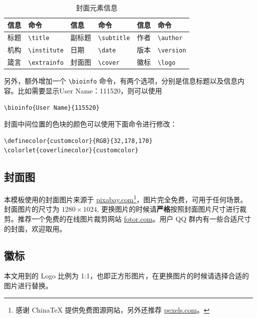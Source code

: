 \documentclass[lang=cn,newtx,10pt,scheme=chinese,pad,twocol]{zznote}
\begin{document}
\begin{table}[htbp]
	\centering
	\caption{封面元素信息}
	\begin{tabular}{p{}p{}|p{}p{}|p{}p{}}
		\hline
		信息 & 命令                     & 信息  & 命令                    & 信息 & 命令                   \\
		\hline
		标题 & \lstinline|\title|     & 副标题 & \lstinline|\subtitle| & 作者 & \lstinline|\author|  \\
		机构 & \lstinline|\institute| & 日期  & \lstinline|\date|     & 版本 & \lstinline|\version| \\
		箴言 & \lstinline|\extrainfo| & 封面图 & \lstinline|\cover|    & 徽标 & \lstinline|\logo|    \\
		\hline
	\end{tabular}
\end{table}

另外，额外增加一个 \lstinline{\bioinfo} 命令，有两个选项，分别是信息标题以及信息内容。比如需要显示{\kaishu User Name：111520}，则可以使用
\begin{lstlisting}
\bioinfo{User Name}{115520}
\end{lstlisting}

封面中间位置的色块的颜色可以使用下面命令进行修改：
\begin{lstlisting}
\definecolor{customcolor}{RGB}{32,178,170}
\colorlet{coverlinecolor}{customcolor}
\end{lstlisting}

\subsection{封面图}

本模板使用的封面图片来源于 \href{https://pixabay.com/en/tea-time-poetry-coffee-reading-3240766/}{pixabay.com}\footnote{感谢 China\TeX{} 提供免费图源网站，另外还推荐 \href{https://www.pexels.com/}{pexels.com}。}，图片完全免费，可用于任何场景。封面图片的尺寸为 $1280 \times 1024$, 更换图片的时候请\textbf{严格}按照封面图片尺寸进行裁剪。推荐一个免费的在线图片裁剪网站 \href{https://www.fotor.com/cn}{fotor.com}。用户 QQ 群内有一些合适尺寸的封面，欢迎取用。

\subsection{徽标}

本文用到的 Logo 比例为 1:1，也即正方形图片，在更换图片的时候请选择合适的图片进行替换。
\end{document}
